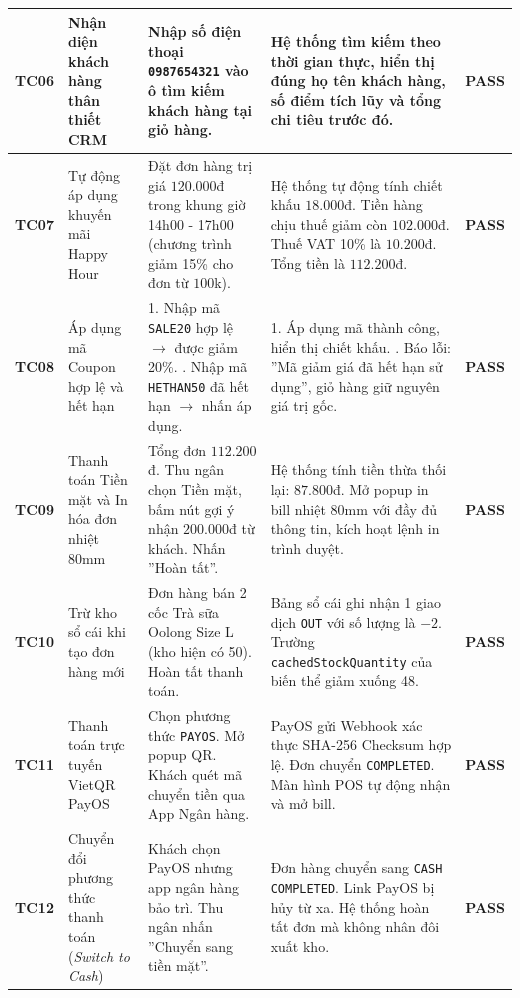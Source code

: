 \begin{longtable}{|c|p{3.2cm}|p{3.8cm}|p{4.2cm}|c|}
\textbf{TC06} & Nhận diện khách hàng thân thiết CRM & Nhập số điện thoại \texttt{0987654321} vào ô tìm kiếm khách hàng tại giỏ hàng. & Hệ thống tìm kiếm theo thời gian thực, hiển thị đúng họ tên khách hàng, số điểm tích lũy và tổng chi tiêu trước đó. & \textbf{PASS} \\ \hline

\textbf{TC07} & Tự động áp dụng khuyến mãi Happy Hour & Đặt đơn hàng trị giá $120.000$đ trong khung giờ 14h00 - 17h00 (chương trình giảm 15\% cho đơn từ $100$k). & Hệ thống tự động tính chiết khấu $18.000$đ. Tiền hàng chịu thuế giảm còn $102.000$đ. Thuế VAT 10\% là $10.200$đ. Tổng tiền là $112.200$đ. & \textbf{PASS} \\ \hline

\textbf{TC08} & Áp dụng mã Coupon hợp lệ và hết hạn & 1. Nhập mã \texttt{SALE20} hợp lệ $\rightarrow$ được giảm 20\%. \newline 2. Nhập mã \texttt{HETHAN50} đã hết hạn $\rightarrow$ nhấn áp dụng. & 1. Áp dụng mã thành công, hiển thị chiết khấu. \newline 2. Báo lỗi: ''Mã giảm giá đã hết hạn sử dụng'', giỏ hàng giữ nguyên giá trị gốc. & \textbf{PASS} \\ \hline

\textbf{TC09} & Thanh toán Tiền mặt và In hóa đơn nhiệt 80mm & Tổng đơn $112.200$đ. Thu ngân chọn Tiền mặt, bấm nút gợi ý nhận $200.000$đ từ khách. Nhấn ''Hoàn tất''. & Hệ thống tính tiền thừa thối lại: $87.800$đ. Mở popup in bill nhiệt 80mm với đầy đủ thông tin, kích hoạt lệnh in trình duyệt. & \textbf{PASS} \\ \hline

\textbf{TC10} & Trừ kho sổ cái khi tạo đơn hàng mới & Đơn hàng bán 2 cốc Trà sữa Oolong Size L (kho hiện có 50). Hoàn tất thanh toán. & Bảng sổ cái ghi nhận 1 giao dịch \texttt{OUT} với số lượng là $-2$. Trường \texttt{cachedStockQuantity} của biến thể giảm xuống 48. & \textbf{PASS} \\ \hline

\textbf{TC11} & Thanh toán trực tuyến VietQR PayOS & Chọn phương thức \texttt{PAYOS}. Mở popup QR. Khách quét mã chuyển tiền qua App Ngân hàng. & PayOS gửi Webhook xác thực SHA-256 Checksum hợp lệ. Đơn chuyển \texttt{COMPLETED}. Màn hình POS tự động nhận và mở bill. & \textbf{PASS} \\ \hline

\textbf{TC12} & Chuyển đổi phương thức thanh toán (\textit{Switch to Cash}) & Khách chọn PayOS nhưng app ngân hàng bảo trì. Thu ngân nhấn ''Chuyển sang tiền mặt''. & Đơn hàng chuyển sang \texttt{CASH} \texttt{COMPLETED}. Link PayOS bị hủy từ xa. Hệ thống hoàn tất đơn mà không nhân đôi xuất kho. & \textbf{PASS} \\ \hline


\end{longtable}
